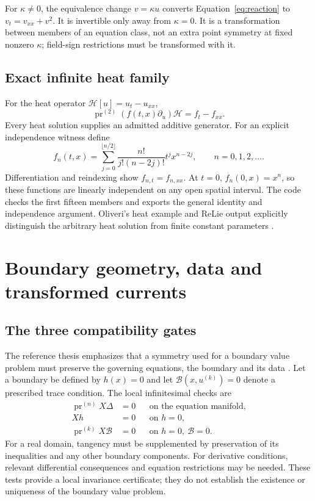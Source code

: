 \documentclass[12pt,a4paper,oneside]{report}
\numberwithin{equation}{chapter}
\newcommand{\pr}{\operatorname{pr}}
\begin{document}
For $\kappa\ne0$, the equivalence change $v=\kappa u$ converts
Equation~\eqref{eq:reaction} to $v_t=v_{xx}+v^2$. It is invertible only away
from $\kappa=0$. It is a transformation between members of an equation class,
not an extra point symmetry at fixed nonzero $\kappa$; field-sign restrictions
must be transformed with it.

\section{Exact infinite heat family}\label{sec:heat}
For the heat operator $\mathcal H[u]=u_t-u_{xx}$,
\begin{equation}
\pr^{(2)}(f(t,x)\partial_u)\mathcal H=f_t-f_{xx}.
\end{equation}
Every heat solution supplies an admitted additive generator. For an explicit
independence witness define
\begin{equation}
f_n(t,x)=\sum_{j=0}^{\lfloor n/2\rfloor}
\frac{n!}{j!(n-2j)!}t^j x^{n-2j},\qquad n=0,1,2,\ldots.
\end{equation}
Differentiation and reindexing show $f_{n,t}=f_{n,xx}$.
At $t=0$, $f_n(0,x)=x^n$, so these functions are linearly independent on any
open spatial interval. The code checks the first fifteen members and exports
the general identity and independence argument. Oliveri's heat example and
ReLie output explicitly distinguish the arbitrary heat solution from finite
constant parameters \cite[pp.~96--98, 428]{oliveri2026}.

\chapter{Boundary geometry, data and transformed currents}\label{ch:boundary}
\section{The three compatibility gates}
The reference thesis emphasizes that a symmetry used for a boundary value
problem must preserve the governing equations, the boundary and its data
\cite[Sec.~2.3.4, p.~28]{hijazi}. Let a boundary be defined by
$h(x)=0$ and let $\mathcal B(x,u^{(k)})=0$ denote a prescribed trace condition.
The local infinitesimal checks are
\begin{align}
\pr^{(n)}X\Delta&=0&&\text{on the equation manifold},\\
Xh&=0&&\text{on }h=0,\label{eq:boundarytangent}\\
\pr^{(k)}X\mathcal B&=0&&\text{on }h=0,\ \mathcal B=0.
\end{align}
For a real domain, tangency must be supplemented by preservation of its
inequalities and any other boundary components. For derivative conditions,
relevant differential consequences and equation restrictions may be needed.
These tests provide a local invariance certificate; they do not establish the
existence or uniqueness of the boundary value problem.
\end{document}
